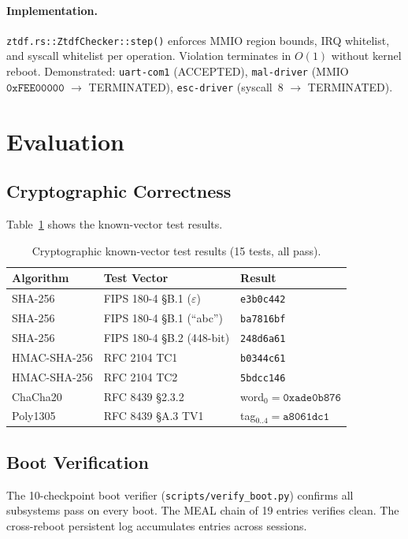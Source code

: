 \documentclass[10pt,twocolumn]{article}
\begin{document}
\paragraph{Implementation.} \texttt{ztdf.rs::ZtdfChecker::step()} enforces
MMIO region bounds, IRQ whitelist, and syscall whitelist per operation.
Violation terminates in $O(1)$ without kernel reboot.
Demonstrated: \texttt{uart-com1} (ACCEPTED), \texttt{mal-driver}
(MMIO $\texttt{0xFEE00000}$ $\to$ TERMINATED), \texttt{esc-driver}
(syscall~8 $\to$ TERMINATED).

\section{Evaluation}

\subsection{Cryptographic Correctness}

Table~\ref{tab:vectors} shows the known-vector test results.

\begin{table}[h]
\centering
\begin{tabular}{@{}lll@{}}
\toprule
Algorithm & Test Vector & Result \\
\midrule
SHA-256 & FIPS 180-4 \S B.1 ($\varepsilon$) & \texttt{e3b0c442} \\
SHA-256 & FIPS 180-4 \S B.1 (``abc'') & \texttt{ba7816bf} \\
SHA-256 & FIPS 180-4 \S B.2 (448-bit) & \texttt{248d6a61} \\
HMAC-SHA-256 & RFC 2104 TC1 & \texttt{b0344c61} \\
HMAC-SHA-256 & RFC 2104 TC2 & \texttt{5bdcc146} \\
ChaCha20 & RFC 8439 \S 2.3.2 & word$_0 = \texttt{0xade0b876}$ \\
Poly1305 & RFC 8439 \S A.3 TV1 & tag$_{0..4} = \texttt{a8061dc1}$ \\
\bottomrule
\end{tabular}
\caption{Cryptographic known-vector test results (15 tests, all pass).}
\label{tab:vectors}
\end{table}

\subsection{Boot Verification}

The 10-checkpoint boot verifier (\texttt{scripts/verify\_boot.py})
confirms all subsystems pass on every boot. The MEAL chain of 19 entries
verifies clean. The cross-reboot persistent log accumulates entries
across sessions.
\end{document}

